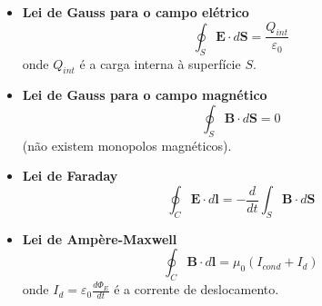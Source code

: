 \documentclass[12pt]{article}
\begin{document}
\begin{itemize}
    \item [(a)] \textbf{Lei de Gauss para o campo elétrico}
        \begin{equation}
            \boxed{\oint_{S} \mathbf{E}\cdot d\mathbf{S} = \frac{Q_{int}}{\varepsilon_0}}
        \end{equation}
        \noindent onde \(Q_{int}\) é a carga interna à superfície \(S\).

    \item [(b)] \textbf{Lei de Gauss para o campo magnético}
        \begin{equation}
            \boxed{\oint_{S} \mathbf{B} \cdot d\mathbf{S} = 0}
        \end{equation}
        \noindent (não existem monopolos magnéticos).
    \item [(c)] \textbf{Lei de Faraday}
        \begin{equation}
            \boxed{\oint_{C} \mathbf{E} \cdot d\mathbf{l} = -\frac{d}{dt}\int_{S} \mathbf{B} \cdot d\mathbf{S}}
        \end{equation}
    \item [(d)] \textbf{Lei de Ampère-Maxwell}
        \begin{equation}
            \boxed{\oint_{C} \mathbf{B} \cdot d\mathbf{l} = \mu_0 \left( I_{cond} + I_{d} \right)}
        \end{equation}
        \noindent onde \(\displaystyle I_{d} = \varepsilon_0 \frac{d\Phi_E}{dt}\) é a corrente de deslocamento.
\end{itemize}
\end{document}
